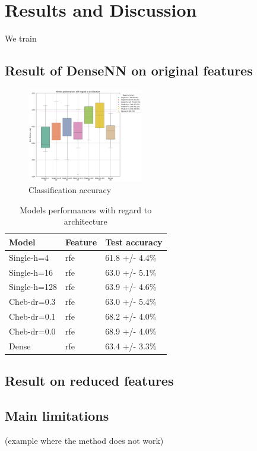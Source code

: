 
\section{Results and Discussion}

We train

\subsection{Result of DenseNN on original features}

\begin{figure}[h!]
    \centering
    \includegraphics[width=0.45\textwidth]{figures/model_performances_architecture.png}
    \caption{Classification accuracy}
    \Description{}
    \label{fig:results_architecture}
\end{figure}

\begin{table}[H]
	\begin{center}
		\begin{tabular}{lll}
			Model & Feature & Test accuracy \\
			\hline
			Single-h=4 & rfe & 61.8 +/- 4.4\% \\
			Single-h=16 & rfe & 63.0 +/- 5.1\% \\
			Single-h=128 & rfe & 63.9 +/- 4.6\% \\
			Cheb-dr=0.3 & rfe & 63.0 +/- 5.4\% \\
			Cheb-dr=0.1 & rfe & 68.2 +/- 4.0\% \\
			Cheb-dr=0.0 & rfe & 68.9 +/- 4.0\% \\
			Dense & rfe & 63.4 +/- 3.3\% \\
		\end{tabular}
	\end{center}
	\caption{Models performances with regard to architecture}
	\label{table:dependance_on_architecture}
\end{table}


\subsection{Result on reduced features}

\subsection{Main limitations}

(example where the method does not work) 